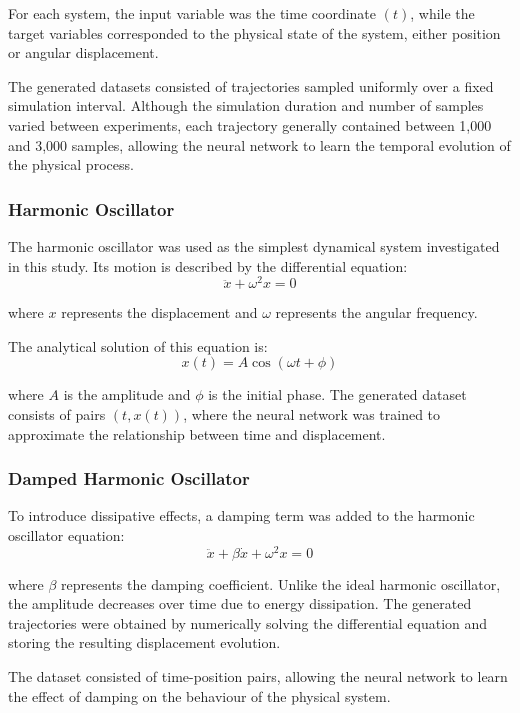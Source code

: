 For each system, the input variable was the time coordinate $(t)$, while the target variables corresponded to the physical state of the system, either position or angular displacement.

The generated datasets consisted of trajectories sampled uniformly over a fixed simulation interval. Although the simulation duration and number of samples varied between experiments, each trajectory generally contained between 1,000 and 3,000 samples, allowing the neural network to learn the temporal evolution of the physical process.

\subsubsection{Harmonic Oscillator}
The harmonic oscillator was used as the simplest dynamical system investigated in this study. Its motion is described by the differential equation:
\begin{equation}
\ddot{x}+\omega^2 x=0
\end{equation}

where $x$ represents the displacement and $\omega$ represents the angular frequency.

The analytical solution of this equation is:
\begin{equation}
x(t)=A\cos(\omega t+\phi) 
\end{equation}

where $A$ is the amplitude and $\phi$ is the initial phase.
The generated dataset consists of pairs $(t,x(t))$, where the neural network was trained to approximate the relationship between time and displacement.

\subsubsection{Damped Harmonic Oscillator}
To introduce dissipative effects, a damping term was added to the harmonic oscillator equation:
\begin{equation}
\ddot{x}+\beta\dot{x}+\omega^2 x=0
\end{equation}

where $\beta$ represents the damping coefficient.
Unlike the ideal harmonic oscillator, the amplitude decreases over time due to energy dissipation. The generated trajectories were obtained by numerically solving the differential equation and storing the resulting displacement evolution.

The dataset consisted of time-position pairs, allowing the neural network to learn the effect of damping on the behaviour of the physical system.

